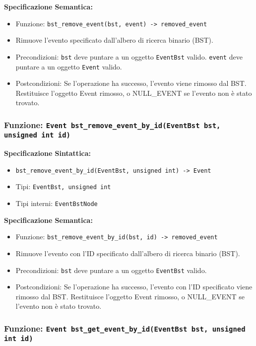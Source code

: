 \documentclass[11pt]{scrartcl} %
\begin{document}
\textbf{Specificazione Semantica:}
\begin{itemize}
\item Funzione: \texttt{bst\_remove\_event(bst, event) -> removed\_event}
\item Rimuove l'evento specificato dall'albero di ricerca binario (BST).
\item Precondizioni: \texttt{bst} deve puntare a un oggetto \texttt{EventBst} valido. \texttt{event} deve puntare a un oggetto \texttt{Event} valido.
\item Postcondizioni: Se l'operazione ha successo, l'evento viene rimosso dal BST. Restituisce l'oggetto Event rimosso, o NULL\_EVENT se l'evento non è stato trovato.
\end{itemize}

\subsubsection{Funzione: \texttt{Event bst\_remove\_event\_by\_id(EventBst bst, unsigned int id)}}

\textbf{Specificazione Sintattica:}
\begin{itemize}
\item \texttt{bst\_remove\_event\_by\_id(EventBst, unsigned int) -> Event}
\item Tipi: \texttt{EventBst, unsigned int}
\item Tipi interni: \texttt{EventBstNode}
\end{itemize}

\textbf{Specificazione Semantica:}
\begin{itemize}
\item Funzione: \texttt{bst\_remove\_event\_by\_id(bst, id) -> removed\_event}
\item Rimuove l'evento con l'ID specificato dall'albero di ricerca binario (BST).
\item Precondizioni: \texttt{bst} deve puntare a un oggetto \texttt{EventBst} valido.
\item Postcondizioni: Se l'operazione ha successo, l'evento con l'ID specificato viene rimosso dal BST. Restituisce l'oggetto Event rimosso, o NULL\_EVENT se l'evento non è stato trovato.
\end{itemize}

\subsubsection{Funzione: \texttt{Event bst\_get\_event\_by\_id(EventBst bst, unsigned int id)}}
\end{document}
